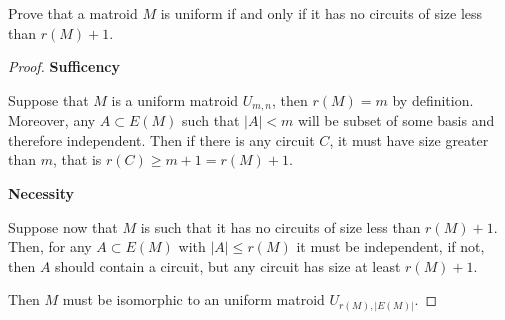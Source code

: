 \prob
{\label{t1:p6}
    Prove that a matroid $M$ is uniform if and only if it has no circuits of 
    size less than $r(M) + 1$.
}
\begin{proof}
    \textbf{Sufficency}\pn

	Suppose that $M$ is a uniform matroid $U_{m, n}$, then $r(M) = m$ by definition.
    Moreover, any $A \subset E(M)$ such that $|A| < m$ will be subset of some basis and
    therefore independent. Then if there is any circuit $C$, it must have size greater
    than $m$, that is $r(C) \geq m + 1 = r(M) + 1$.\pn

    \textbf{Necessity}\pn
    
    Suppose now that $M$ is such that it has no circuits of size less than $r(M) + 1$.
    Then, for any $A \subset E(M)$ with $|A| \leq r(M)$ it must be independent, if not,
    then $A$ should contain a circuit, but any circuit has size at least $r(M) + 1$.\pn
    
    Then $M$ must be isomorphic to an uniform matroid $U_{r(M), |E(M)|}$.
\end{proof}